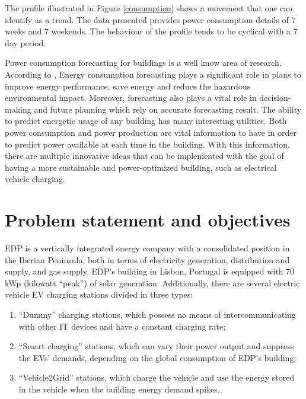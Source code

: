 The profile illustrated in Figure \ref{consumption} shows a movement that one can identify as a trend. The data presented provides power consumption details of 7 weeks and 7 weekends. The behaviour of the profile tends to be cyclical with a 7 day period.

Power consumption forecasting for buildings is a well know area of research. According to \cite{CivilEU}, Energy consumption forecasting plays a significant role in plans to improve energy performance, save energy and reduce the hazardous environmental impact. Moreover, forecasting also plays a vital role in decision-making and future planning which rely on accurate forecasting result. The ability to predict energetic usage of any building has many interesting utilities. Both power consumption and power production are vital information to have in order to predict power available at each time in the building. With this information, there are multiple innovative ideas that can be implemented with the goal of having a more sustainable and power-optimized building, such as electrical vehicle charging.   



\section{Problem statement and objectives}


\ac{EDP} is a vertically integrated energy company with a consolidated position in the Iberian Peninsula, both in terms of electricity generation, distribution and supply, and gas supply. \ac{EDP}'s building in Lisbon, Portugal is equipped with 70 kWp (kilowatt “peak”) of solar generation. Additionally, there are several electric vehicle \ac{EV} charging stations divided in three types:

\begin{enumerate}[noitemsep,topsep=0pt]
  \itemsep0em 
  \item “Dummy” charging stations, which possess no means of intercommunicating with other \ac{IT} devices and have a constant charging rate;
  \item\label{two} “Smart charging” stations, which can vary their power output and suppress the \ac{EV}s’ demands, depending on the global consumption of \ac{EDP}'s building;
  \item “Vehicle2Grid” stations, which charge the vehicle and use the energy stored in the vehicle when the building energy demand spikes..
\end{enumerate} 

